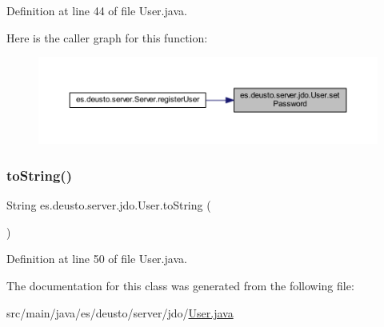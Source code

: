 Definition at line 44 of file User.\+java.

Here is the caller graph for this function\+:
\nopagebreak
\begin{figure}[H]
\begin{center}
\leavevmode
\includegraphics[width=350pt]{classes_1_1deusto_1_1server_1_1jdo_1_1_user_a2e052b5a7cab949f61580edf44bbd233_icgraph}
\end{center}
\end{figure}
\mbox{\label{classes_1_1deusto_1_1server_1_1jdo_1_1_user_a65366a578a6dcc53e3a77d6eabbbf8cf}} 
\subsubsection{\texorpdfstring{toString()}{toString()}}
{\footnotesize\ttfamily String es.\+deusto.\+server.\+jdo.\+User.\+to\+String (\begin{DoxyParamCaption}{ }\end{DoxyParamCaption})}



Definition at line 50 of file User.\+java.



The documentation for this class was generated from the following file\+:\begin{DoxyCompactItemize}
\item 
src/main/java/es/deusto/server/jdo/\mbox{\hyperlink{_user_8java}{User.\+java}}\end{DoxyCompactItemize}
